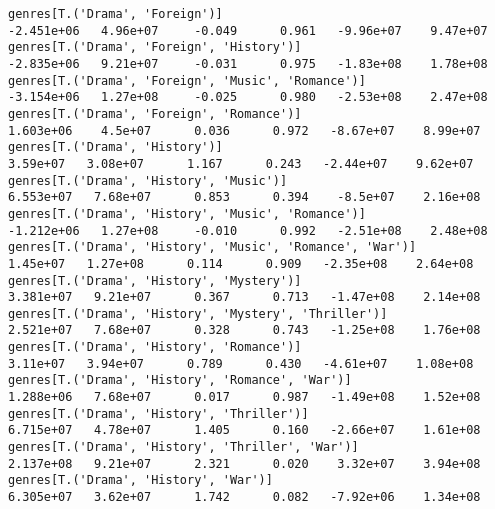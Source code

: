 \documentclass[11pt]{article}
\begin{document}
\begin{Verbatim}[commandchars=\\\{\}]
genres[T.('Drama', 'Foreign')]                                                                               -2.451e+06   4.96e+07     -0.049      0.961   -9.96e+07    9.47e+07
genres[T.('Drama', 'Foreign', 'History')]                                                                    -2.835e+06   9.21e+07     -0.031      0.975   -1.83e+08    1.78e+08
genres[T.('Drama', 'Foreign', 'Music', 'Romance')]                                                           -3.154e+06   1.27e+08     -0.025      0.980   -2.53e+08    2.47e+08
genres[T.('Drama', 'Foreign', 'Romance')]                                                                     1.603e+06    4.5e+07      0.036      0.972   -8.67e+07    8.99e+07
genres[T.('Drama', 'History')]                                                                                 3.59e+07   3.08e+07      1.167      0.243   -2.44e+07    9.62e+07
genres[T.('Drama', 'History', 'Music')]                                                                       6.553e+07   7.68e+07      0.853      0.394    -8.5e+07    2.16e+08
genres[T.('Drama', 'History', 'Music', 'Romance')]                                                           -1.212e+06   1.27e+08     -0.010      0.992   -2.51e+08    2.48e+08
genres[T.('Drama', 'History', 'Music', 'Romance', 'War')]                                                      1.45e+07   1.27e+08      0.114      0.909   -2.35e+08    2.64e+08
genres[T.('Drama', 'History', 'Mystery')]                                                                     3.381e+07   9.21e+07      0.367      0.713   -1.47e+08    2.14e+08
genres[T.('Drama', 'History', 'Mystery', 'Thriller')]                                                         2.521e+07   7.68e+07      0.328      0.743   -1.25e+08    1.76e+08
genres[T.('Drama', 'History', 'Romance')]                                                                      3.11e+07   3.94e+07      0.789      0.430   -4.61e+07    1.08e+08
genres[T.('Drama', 'History', 'Romance', 'War')]                                                              1.288e+06   7.68e+07      0.017      0.987   -1.49e+08    1.52e+08
genres[T.('Drama', 'History', 'Thriller')]                                                                    6.715e+07   4.78e+07      1.405      0.160   -2.66e+07    1.61e+08
genres[T.('Drama', 'History', 'Thriller', 'War')]                                                             2.137e+08   9.21e+07      2.321      0.020    3.32e+07    3.94e+08
genres[T.('Drama', 'History', 'War')]                                                                         6.305e+07   3.62e+07      1.742      0.082   -7.92e+06    1.34e+08

\end{Verbatim}
\end{document}

